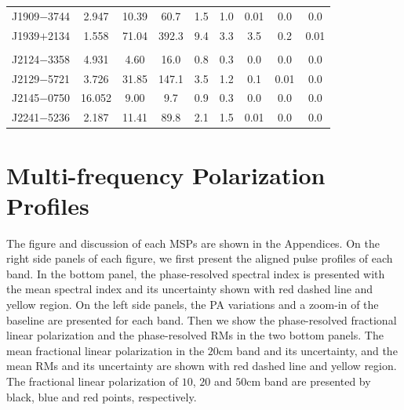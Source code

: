 \documentclass[useAMS,usenatbib]{mn2e}
\begin{document}
\begin{table}
\begin{center}
\begin{tabular}{lcccccccc}
J1909$-$3744&  2.947  &  10.39            & 60.7     & 1.5       & 1.0         &  0.01    &  0.0              &  0.0      \\ 
J1939$+$2134&  1.558  &  71.04            & 392.3    & 9.4       & 3.3         &  3.5     &  0.2              &  0.01     \\ 
            &         &                   &          &           &             &          &                   &           \\
J2124$-$3358&  4.931  &  4.60             & 16.0     & 0.8       & 0.3         &  0.0     &  0.0              &  0.0   \\ 
J2129$-$5721&  3.726  &  31.85            & 147.1    & 3.5       & 1.2         &  0.1     &  0.01             &  0.0   \\ 
J2145$-$0750&  16.052 &  9.00             & 9.7      & 0.9       & 0.3         &  0.0     &  0.0              &  0.0   \\ 
J2241$-$5236&  2.187  &  11.41            & 89.8     & 2.1       & 1.5         &  0.01    &  0.0              &  0.0  \\ 
%
\hline
\end{tabular}
\end{center}
\end{table}
	

\section{Multi-frequency Polarization Profiles}

%
%
The figure and discussion of each MSPs are shown in the Appendices. 
On the right side panels of each figure, we first present the aligned pulse 
profiles of each band. In the bottom panel, the phase-resolved spectral index 
is presented with the mean spectral index and its uncertainty shown with 
red dashed line and yellow region.
%
On the left side panels, the PA variations and a zoom-in of the baseline 
are presented for each band. Then we show the phase-resolved fractional 
linear polarization and the phase-resolved RMs in the two bottom panels.
%
The mean fractional linear polarization in the $20$cm band and its uncertainty, 
and the mean RMs and its uncertainty are shown with red dashed line and 
yellow region.
%
The fractional linear polarization of $10$, $20$ and $50$cm band are 
presented by black, blue and red points, respectively. 
%
\end{document}
